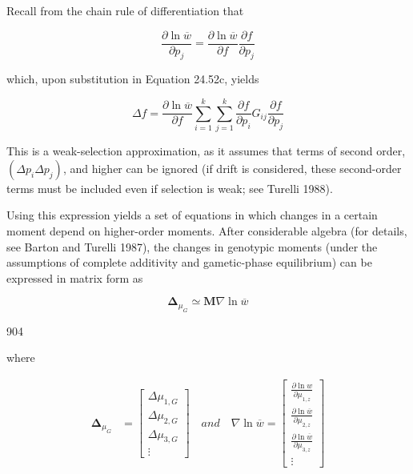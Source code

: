 \documentclass{article}
\begin{document}
Recall from the chain rule of differentiation that

\begin{equation}
\frac{\partial\ln\overline{w}}{\partial p_{j}}=\frac{\partial\ln\overline{w}}{\partial f}\frac{\partial f}{\partial p_{j}}
\end{equation}

which, upon substitution in Equation 24.52c, yields

\begin{equation}
\Delta f=\frac{\partial\ln\overline{w}}{\partial f}\sum_{i=1}^{k}\sum_{j=1}^{k}\frac{\partial f}{\partial p_{i}}G_{ij}\frac{\partial f}{\partial p_{j}}
\tag{24.25d}
\label{eq:24_25d}
\end{equation}

This is a weak-selection approximation, as it assumes that terms of second order,  $ (\Delta p_i \Delta p_j) $, and higher can be ignored (if drift is considered, these second-order terms must be included even if selection is weak; see Turelli 1988).

Using this expression yields a set of equations in which changes in a certain moment depend on higher-order moments. After considerable algebra (for details, see Barton and Turelli 1987), the changes in genotypic moments (under the assumptions of complete additivity and gametic-phase equilibrium) can be expressed in matrix form as

\begin{equation}
\mathbf{\Delta}_{\mu_{G}}\simeq\mathbf{M}\nabla\ln\overline{{w}}
\tag{24.26a}
\label{eq:24_26a}
\end{equation}

904

where

\begin{equation}
\begin{aligned}\boldsymbol{\Delta}_{\mu_{G}}&=\begin{bmatrix}\Delta\mu_{1,G}\\\Delta\mu_{2,G}\\\Delta\mu_{3,G}\\\vdots\end{bmatrix}\quad and\quad\nabla\ln\overline{w}=\begin{bmatrix}\frac{\partial\ln w}{\partial\mu_{1,z}}\\\frac{\partial\ln\overline{w}}{\partial\mu_{2,z}}\\\frac{\partial\ln\overline{w}}{\partial\mu_{3,z}}\\\vdots\end{bmatrix}\end{aligned}
\tag{24.26b}
\label{eq:24_26b}
\end{equation}
\end{document}

